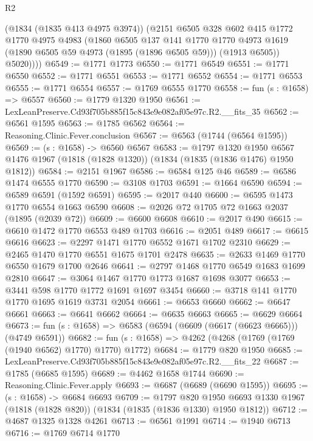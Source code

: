 \begin{lexlean}{R2}
\begin{coremodule}
          (@1834 (@1835 @413 @4975 @3974))
          (@2151
            @6505
            @328
            @602
            @415
            @1772
            @1770
            @4975
            @4983
            (@1860
              @6505
              @137
              @141
              @1770
              @1770
              @4973
              @1619
              (@1890 @6505 @59 @4973 (@1895 (@1896 @6505 @59)))
              (@1913 @6505))
            @5020))))
@6549 := @1771 @1773
@6550 := @1771 @6549
@6551 := @1771 @6550
@6552 := @1771 @6551
@6553 := @1771 @6552
@6554 := @1771 @6553
@6555 := @1771 @6554
@6557 := @1769 @6555 @1770
@6558 := fun (s : @1658) => @6557
@6560 := @1779 @1320 @1950
@6561 := LexLeanPreserve.Cd93f705b885f15c843e9e082af05e97c.R2.__fits_35
@6562 := @6561 @1595
@6563 := @1785 @6562
@6564 := Reasoning.Clinic.Fever.conclusion
@6567 := @6563 (@1744 (@6564 @1595))
@6569 := (s : @1658) -> @6560 @6567
@6583 := @1797
    @1320
    @1950
    @6567
    @1476
    @1967
    (@1818 (@1828 @1320))
    (@1834 (@1835 (@1836 @1476) @1950 @1812))
@6584 := @2151 @1967
@6586 := @6584 @125 @46
@6589 := @6586 @1474 @6555 @1770
@6590 := @3108 @1703
@6591 := @1664 @6590
@6594 := @6589 @6591 (@1592 @6591)
@6595 := @2017 @440
@6600 := @6595 @1473 @1770 @6554 @1663 @6590
@6608 := @2026 @72 @1705 @72 @1663 @2037 (@1895 (@2039 @72))
@6609 := @6600 @6608
@6610 := @2017 @490
@6615 := @6610 @1472 @1770 @6553 @489 @1703
@6616 := @2051 @489
@6617 := @6615 @6616
@6623 := @2297 @1471 @1770 @6552 @1671 @1702 @2310
@6629 := @2465 @1470 @1770 @6551 @1675 @1701 @2478
@6635 := @2633 @1469 @1770 @6550 @1679 @1700 @2646
@6641 := @2797 @1468 @1770 @6549 @1683 @1699 @2810
@6647 := @3064 @1467 @1770 @1773 @1687 @1698 @3077
@6653 := @3441 @598 @1770 @1772 @1691 @1697 @3454
@6660 := @3718 @141 @1770 @1770 @1695 @1619 @3731 @2054
@6661 := @6653 @6660
@6662 := @6647 @6661
@6663 := @6641 @6662
@6664 := @6635 @6663
@6665 := @6629 @6664
@6673 := fun (s : @1658) => @6583 (@6594 (@6609 (@6617 (@6623 @6665))) (@4749 @6591))
@6682 := fun (s : @1658) => @4262 (@4268 (@1769 (@1769 (@1940 @6562) @1770) @1770) @1772)
@6684 := @1779 @820 @1950
@6685 := LexLeanPreserve.Cd93f705b885f15c843e9e082af05e97c.R2.__fits_22
@6687 := @1785 (@6685 @1595)
@6689 := @4462 @1658 @1744
@6690 := Reasoning.Clinic.Fever.apply
@6693 := @6687 (@6689 (@6690 @1595))
@6695 := (s : @1658) -> @6684 @6693
@6709 := @1797
    @820
    @1950
    @6693
    @1330
    @1967
    (@1818 (@1828 @820))
    (@1834 (@1835 (@1836 @1330) @1950 @1812))
@6712 := @4687 @1325 @1328 @4261
@6713 := @6561 @1991
@6714 := @1940 @6713
@6716 := @1769 @6714 @1770

\end{coremodule}
\end{lexlean}
